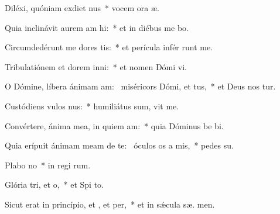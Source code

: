 \item Diléxi, quóniam exdiet nus~* vocem ora æ.
\item Quia inclinávit aurem am hi:~* et in diébus me bo.
\item Circumdedérunt me dores tis:~* et perícula infér runt me.
\item Tribulatiónem et dorem inni:~* et nomen Dómi vi.
\item O Dómine, líbera ánimam am:~\pscross{} miséricors Dómi, et tus,~* et Deus nos tur.
\item Custódiens vulos nus:~* humiliátus sum,  vit me.
\item Convértere, ánima mea, in quiem am:~* quia Dóminus be bi.
\item Quia erípuit ánimam meam de te:~\pscross{} óculos os a mis,~* pedes   su.
\item Plabo no~* in regi rum.
\item Glória tri, et o,~* et Spi to.
\item Sicut erat in princípio, et , et per,~* et in sǽcula sæ. men.
